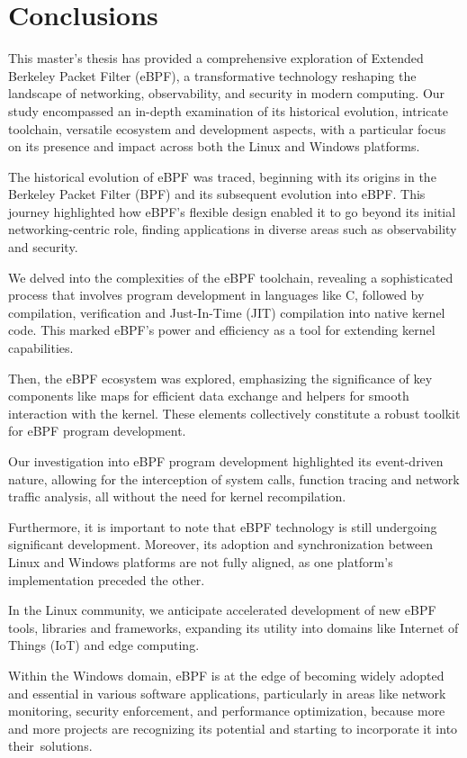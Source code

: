 \chapter{Conclusions}

This master's thesis has provided a comprehensive exploration of Extended Berkeley Packet Filter (eBPF), a transformative technology reshaping the landscape of networking, observability, and security in modern computing. 
Our study encompassed an in-depth examination of its historical evolution, intricate toolchain, versatile ecosystem and development aspects, with a particular focus on its presence and impact across both the Linux and Windows platforms.

The historical evolution of eBPF was traced, beginning with its origins in the Berkeley Packet Filter (BPF) and its subsequent evolution into eBPF. 
This journey highlighted how eBPF's flexible design enabled it to go beyond its initial networking-centric role, finding applications in diverse areas such as observability and security.

We delved into the complexities of the eBPF toolchain, revealing a sophisticated process that involves program development in languages like C, followed by compilation, verification and Just-In-Time (JIT) compilation into native kernel code.
This marked eBPF's power and efficiency as a tool for extending kernel capabilities.

Then, the eBPF ecosystem was explored, emphasizing the significance of key components like maps for efficient data exchange and helpers for smooth interaction with the kernel.
These elements collectively constitute a robust toolkit for eBPF program development.

Our investigation into eBPF program development highlighted its event-driven nature, allowing for the interception of system calls, function tracing and network traffic analysis, all without the need for kernel recompilation.

Furthermore, it is important to note that eBPF technology is still undergoing significant development. 
Moreover, its adoption and synchronization between Linux and Windows platforms are not fully aligned, as one platform's implementation preceded the other.

In the Linux community, we anticipate accelerated development of new eBPF tools, libraries and frameworks, expanding its utility into domains like Internet of Things (IoT) and edge computing.

Within the Windows domain, eBPF is at the edge of becoming widely adopted and essential in various software applications, particularly in areas like network monitoring, security enforcement, and performance optimization, because more and more projects are recognizing its potential and starting to incorporate it into their solutions.

